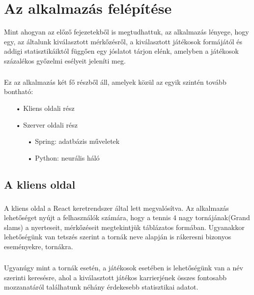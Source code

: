 \chapter{Az alkalmazás felépítése}\label{ch:felepites}

\begin{osszefoglal}
	Mint ahogyan az előző fejezetekből is megtudhattuk, az alkalmazás lényege, hogy egy, az általunk kiválasztott mérkőzésről, a kiválasztott játékosok formájától és addigi statisztikáiktól függően egy jóslatot tárjon elénk, amelyben a játékosok százalékos győzelmi esélyeit jeleníti meg. 
	\paragraph{}
	Ez az alkalmazás két fő részből áll, amelyek közül az egyik szintén tovább bontható:
	\begin{enumerate}
		\item[•] Kliens oldali rész
		\item[•] Szerver oldali rész
		\begin{enumerate}
			\item[•] Spring: adatbázis műveletek
			\item[•] Python: neurális háló
		\end{enumerate}
	\end{enumerate}
\end{osszefoglal}

\section{A kliens oldal}
\paragraph{}
A kliens oldal a  React keretrendszer által lett megvalósítva. Az alkalmazás lehetőséget nyújt a felhasználók számára, hogy a tennis 4 nagy tornájának(Grand slams) a nyerteseit, mérkőzéseit megtekintjük táblázatos formában. Ugyanakkor lehetőségünk van tetszés szerint a tornák neve alapján is rákeresni bizonyos eseményekre, tornákra. 
\paragraph{}
Ugyanúgy mint a tornák esetén, a játékosok esetében is lehetőségünk van a név szerinti keresésre, ahol a kiválasztott játékos karrierjének összes fontosabb mozzanatáról találhatunk néhány érdekesebb statisztikai adatot.
